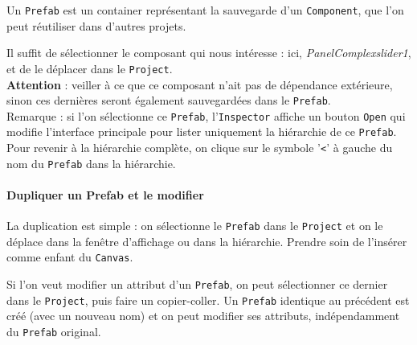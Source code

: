\documentclass[a4paper,10pt]{article}
\newenvironment{solution}%
{\begin{tcolorbox}[breakable,colback=red!5!white,colframe=red!75!black,title=Solution]}%
{\end{tcolorbox}}
\begin{document}
\ifversionenseignant
\begin{solution}
Un \texttt{Prefab} est un container représentant la sauvegarde d'un \texttt{Component}, que l'on peut réutiliser dans d'autres projets.

Il suffit de sélectionner le composant qui nous intéresse : ici, \textit{PanelComplexslider1}, et de le déplacer dans le \texttt{Project}.\\

\textbf{Attention} : veiller à ce que ce composant n'ait pas de dépendance extérieure, sinon ces dernières seront également sauvegardées dans le \texttt{Prefab}.\\

Remarque : si l'on sélectionne ce \texttt{Prefab}, l'\texttt{Inspector} affiche un bouton \texttt{Open} qui modifie l'interface principale pour lister uniquement la hiérarchie de ce \texttt{Prefab}. Pour revenir à la hiérarchie complète, on clique sur le symbole '\texttt{<}' à gauche du nom du \texttt{Prefab} dans la hiérarchie.

\paragraph{Dupliquer un Prefab et le modifier}

La duplication est simple : on sélectionne le \texttt{Prefab} dans le \texttt{Project} et on le déplace dans la fenêtre d'affichage ou dans la hiérarchie. Prendre soin de l'insérer comme enfant du \texttt{Canvas}.


Si l'on veut modifier un attribut d'un \texttt{Prefab}, on peut sélectionner ce dernier dans le \texttt{Project}, puis faire un copier-coller. Un \texttt{Prefab} identique au précédent est créé (avec un nouveau nom) et on peut modifier ses attributs, indépendamment du \texttt{Prefab} original.
	
\end{solution}
\fi 
	
\end{document}

